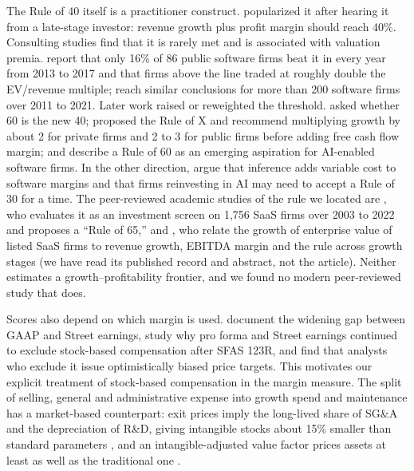 The Rule of 40 itself is a practitioner construct. \citet{feld2015rule} popularized it after hearing it from a late-stage investor: revenue growth plus profit margin should reach 40\%. Consulting studies find that it is rarely met and is associated with valuation premia. \citet{depeyrot2018hacking} report that only 16\% of 86 public software firms beat it in every year from 2013 to 2017 and that firms above the line traded at roughly double the EV/revenue multiple; \citet{roche2021saas} reach similar conclusions for more than 200 software firms over 2011 to 2021. Later work raised or reweighted the threshold. \citet{bosche2022sixty} asked whether 60 is the new 40; \citet{bessemer2024rulex} proposed the Rule of X and recommend multiplying growth by about 2 for private firms and 2 to 3 for public firms before adding free cash flow margin; and \citet{vista2026rethinking} describe a Rule of 60 as an emerging aspiration for AI-enabled software firms. In the other direction, \citet{lipman2026ai} argue that inference adds variable cost to software margins and that firms reinvesting in AI may need to accept a Rule of 30 for a time. The peer-reviewed academic studies of the rule we located are \citet{lee2024evaluating}, who evaluates it as an investment screen on 1,756 SaaS firms over 2003 to 2022 and proposes a ``Rule of 65,'' and \citet{nei2026enterprise}, who relate the growth of enterprise value of listed SaaS firms to revenue growth, EBITDA margin and the rule across growth stages (we have read its published record and abstract, not the article). Neither estimates a growth--profitability frontier, and we found no modern peer-reviewed study that does.

Scores also depend on which margin is used. \citet{bradshaw2002gaap} document the widening gap between GAAP and Street earnings, \citet{barth2012why} study why pro forma and Street earnings continued to exclude stock-based compensation after SFAS 123R, and \citet{mohanram2020stock} find that analysts who exclude it issue optimistically biased price targets. This motivates our explicit treatment of stock-based compensation in the margin measure. The split of selling, general and administrative expense into growth spend and maintenance has a market-based counterpart: exit prices imply the long-lived share of SG\&A and the depreciation of R\&D, giving intangible stocks about 15\% smaller than standard parameters \citep{ewens2025measuring}, and an intangible-adjusted value factor prices assets at least as well as the traditional one \citep{eisfeldt2022intangible}.

